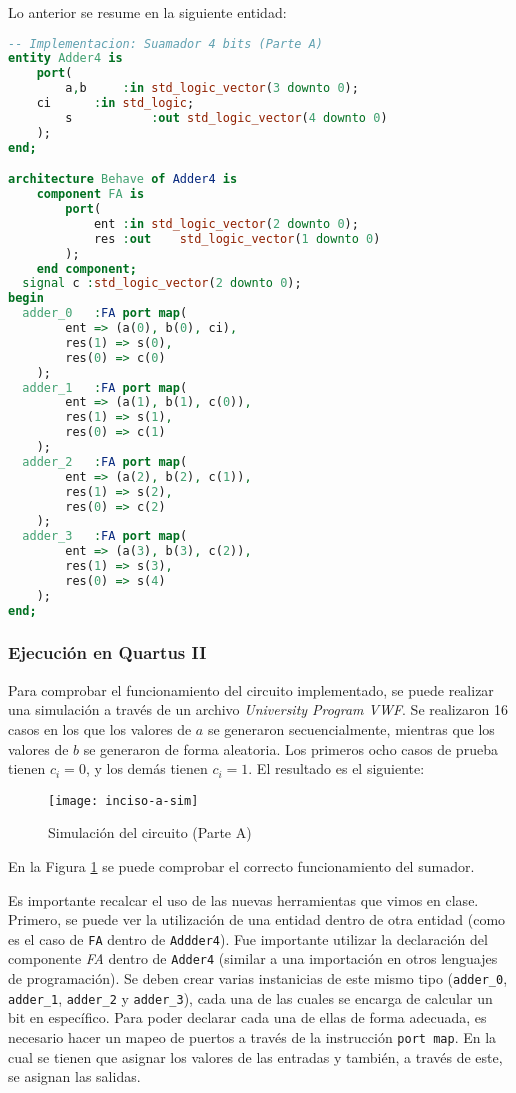 \documentclass[../procedimientos.tex]{subfiles}
\begin{document}
Lo anterior se resume en la siguiente entidad:
\begin{lstlisting}[language=VHDL]
-- Implementacion: Suamador 4 bits (Parte A)
entity Adder4 is
	port(
		a,b		:in std_logic_vector(3 downto 0);
    ci		:in std_logic;
		s			:out std_logic_vector(4 downto 0)
	);
end;

architecture Behave of Adder4 is
	component FA is
		port(
			ent	:in	std_logic_vector(2 downto 0);
			res	:out	std_logic_vector(1 downto 0)
		);
	end component;
  signal c :std_logic_vector(2 downto 0);
begin
  adder_0	:FA port map(
		ent => (a(0), b(0), ci),
		res(1) => s(0),
		res(0) => c(0)
	);
  adder_1	:FA port map(
		ent => (a(1), b(1), c(0)),
		res(1) => s(1),
		res(0) => c(1)
	);
  adder_2	:FA port map(
		ent => (a(2), b(2), c(1)),
		res(1) => s(2),
		res(0) => c(2)
	);
  adder_3	:FA port map(
		ent => (a(3), b(3), c(2)),
		res(1) => s(3),
		res(0) => s(4)
	);
end;
\end{lstlisting}

\subsubsection*{Ejecución en Quartus II}
Para comprobar el funcionamiento del circuito implementado, se puede realizar 
una simulación a través de un archivo \textit{University Program VWF}. Se 
realizaron 16 casos en los que los valores de $a$ se generaron 
secuencialmente, mientras que los valores de $b$ se generaron de forma 
aleatoria. Los primeros ocho casos de prueba tienen $c_i = 0$, y los demás 
tienen $c_i = 1$. El resultado es el siguiente:
\begin{figure}[H]
  \centering
  \texttt{[image: inciso-a-sim]}
  \caption{Simulación del circuito (Parte A)}
  \label{fig:inciso_a_sim}
\end{figure}

En la Figura \ref{fig:inciso_a_sim} se puede comprobar el correcto 
funcionamiento del sumador.

Es importante recalcar el uso de las nuevas herramientas que vimos en clase.  
Primero, se puede ver la utilización de una entidad dentro de otra entidad 
(como es el caso de \texttt{FA} dentro de \texttt{Addder4}). Fue importante 
utilizar la declaración del componente \textit{FA} dentro de \texttt{Adder4} 
(similar a una importación en otros lenguajes de programación). Se deben crear 
varias instanicias de este mismo tipo (\texttt{adder\_0}, \texttt{adder\_1}, 
\texttt{adder\_2} y \texttt{adder\_3}), cada una de las cuales se encarga de 
calcular un bit en específico. Para poder declarar cada una de ellas de forma 
adecuada, es necesario hacer un mapeo de puertos a través de la instrucción 
\texttt{port map}. En la cual se tienen que asignar los valores de las 
entradas y también, a través de este, se asignan las salidas.
\end{document}
